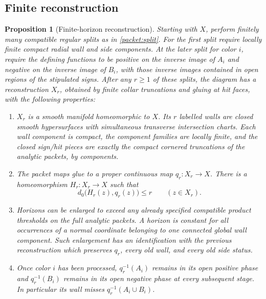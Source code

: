 \documentclass[11pt]{article}
\numberwithin{equation}{section}
\newtheorem{proposition}[theorem]{Proposition}
\theoremstyle{definition}
\theoremstyle{remark}
\begin{document}
\subsection{Finite reconstruction}

\begin{proposition}[Finite-horizon reconstruction]\label{packet:reconstruction}
Starting with $X$, perform finitely many compatible regular splits as
in \cref{packet:split}.  For the first split require locally finite
compact radial wall and side components.  At the later split for
color $i$, require the defining functions to be positive on the inverse
image of $A_i$ and negative on the inverse image of $B_i$, with those
inverse images contained in open regions of the stipulated signs.
After any $r\ge1$ of these splits, the diagram has a reconstruction
$X_r$, obtained by finite collar truncations and gluing at hit faces,
with the following properties:
\begin{enumerate}[label=(\roman*),leftmargin=*]
\item $X_r$ is a smooth manifold homeomorphic to $X$.  Its $r$ labelled
walls are closed smooth hypersurfaces with simultaneous transverse
intersection charts.  Each wall component is compact, the component
families are locally finite, and the closed sign/hit pieces are exactly
the compact cornered truncations of the analytic packets, by components.
\item The packet maps glue to a proper continuous map $q_r:X_r\to X$.
There is a homeomorphism $H_r:X_r\to X$ such that
\begin{equation}\label{packet:displacement}
 d_0\bigl(H_r(z),q_r(z)\bigr)\le r\qquad(z\in X_r).
\end{equation}
\item Horizons can be enlarged to exceed any already specified
compatible product thresholds on the full analytic packets.  A horizon
is constant for all occurrences of a normal coordinate belonging to
one connected global wall component.  Such enlargement has an
identification with the previous reconstruction which preserves
$q_r$, every old wall, and every old side status.
\item Once color $i$ has been processed, $q_r^{-1}(A_i)$ remains in its
open positive phase and $q_r^{-1}(B_i)$ remains in its open negative
phase at every subsequent stage.  In particular its wall misses
$q_r^{-1}(A_i\cup B_i)$.
\end{enumerate}
\end{proposition}
\end{document}
